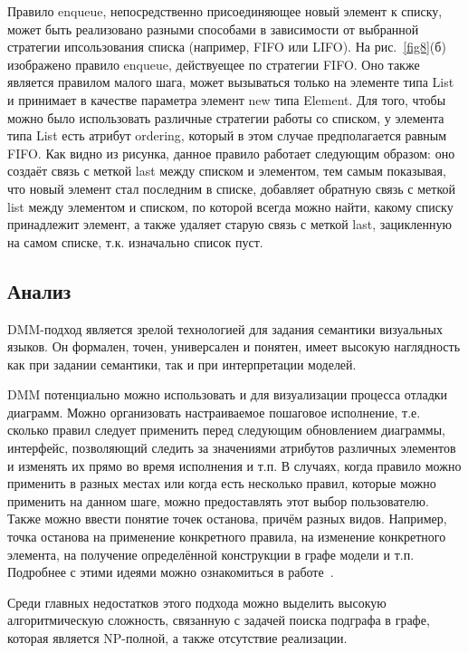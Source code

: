 \documentclass[a5paper]{article}
\begin{document}
Правило enqueue, непосредственно присоединяющее новый элемент к списку, может быть реализовано разными способами в зависимости от выбранной стратегии ипсользования списка (например, FIFO или LIFO). На рис.~\ref{fig8}(б) изображено правило enqueue, действуещее по стратегии FIFO. Оно также является правилом малого шага, может вызываться только на элементе типа List и принимает в качестве параметра элемент new типа Element. Для того, чтобы можно было использовать различные стратегии работы со списком, у элемента типа List есть атрибут ordering, который в этом случае предполагается равным FIFO. Как видно из рисунка, данное правило работает следующим образом: оно создаёт связь с меткой last между списком и элементом, тем самым показывая, что новый элемент стал последним в списке, добавляет обратную связь с меткой list между элементом и списком, по которой всегда можно найти, какому списку принадлежит элемент, а также удаляет старую связь с меткой last, зацикленную на самом списке, т.к. изначально список пуст.

\subsection{Анализ}

DMM-подход является зрелой технологией для задания семантики визуальных языков. Он формален, точен, универсален и понятен, имеет высокую наглядность как при задании семантики, так и при интерпретации моделей.

DMM потенциально можно использовать и для визуализации процесса отладки диаграмм. Можно организовать настраиваемое пошаговое исполнение, т.е. сколько правил следует применить перед следующим обновлением диаграммы, интерфейс, позволяющий следить за значениями атрибутов различных элементов и изменять их прямо во время исполнения и т.п. В случаях, когда правило можно применить в разных местах или когда есть несколько правил, которые можно применить на данном шаге, можно предоставлять этот выбор пользователю. Также можно ввести понятие точек останова, причём разных видов. Например, точка останова на применение конкретного правила, на изменение конкретного элемента, на получение определённой конструкции в графе модели и т.п. Подробнее с этими идеями можно ознакомиться в работе~\cite{dmm1}.

Среди главных недостатков этого подхода можно выделить высокую алгоритмическую сложность, связанную с задачей поиска подграфа в графе, которая является NP-полной, а также отсутствие реализации.
\end{document}
